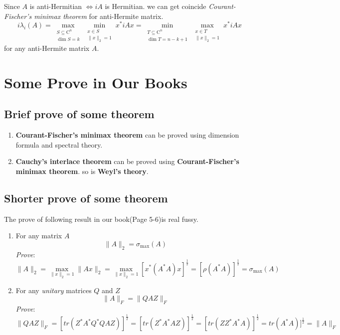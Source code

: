 \documentclass[a4paper,12pt]{article}
\begin{document}
Since $A$ is anti-Hermitian $\iff iA$ is Hermitian.
we can get coincide \textit{Courant-Fischer’s minimax theorem} for anti-Hermite matrix.
\[ i\lambda_i (A) = \max_{\begin{matrix} S \subseteq \mathrm{C}^n \\ \dim S = k \end{matrix} } \min_{\begin{matrix} x \in S \\ \|x\|_2=1 \end{matrix} } x^*iAx =
\min_{\begin{matrix} T \subseteq \mathrm{C}^n \\ \dim T = n-k+1 \end{matrix}} \max_{\begin{matrix} x \in T \\ \|x\|_2=1 \end{matrix} } x^*iAx \]
for any anti-Hermite matrix $A$.


\section{Some Prove in Our Books}
\subsection{Brief prove of some theorem}
\begin{enumerate}
\item
\textbf{Courant-Fischer's minimax theorem} can be proved using dimension formula and spectral theory.
\item
\textbf{Cauchy's interlace theorem} can be proved using \textbf{Courant-Fischer's minimax theorem}. so is \textbf{Weyl's theory}.
\end{enumerate}

\subsection{Shorter prove of some theorem}
The prove of following result in our book(Page 5-6)is real fussy.
\begin{enumerate}
\item
For any matrix $A$
\[ \|A\|_2 = \sigma_{\max}(A) \] 
\textit{Prove}:
\[ \|A\|_2 = \max_{\|x\|_2 = 1} \|Ax\|_2 = \max_{\|x\|_2 = 1} [x^*(A^*A)x]^\frac{1}{2} = [\rho(A^*A)]^\frac{1}{2} = \sigma_{\max}(A) \]
\item
For any \textit{unitary} matrices $Q$ and $Z$
\[ \|A\|_F= \|QAZ\|_F \]
\textit{Prove}:
\[ \|QAZ\|_F = [tr(Z^*A^*Q^*QAZ)]^\frac{1}{2}= [tr(Z^*A^*AZ)]^\frac{1}{2}=[tr(ZZ^*A^*A)]^\frac{1}{2}=tr(A^*A)]^\frac{1}{2}= \|A\|_F \]
\end{enumerate}
\end{document}

